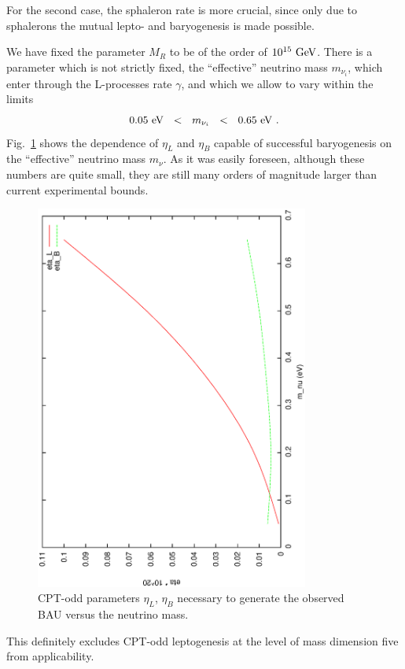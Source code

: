 \documentclass[12pt]{revtex4}
\newcommand{\GeV}{{\rm GeV}}
\newcommand{\eV}{{\rm eV}}
\begin{document}
	For the second case, the sphaleron rate is more crucial, since
	only due to sphalerons the mutual lepto- and baryogenesis is
	made possible. 
	

	We have fixed the parameter $ M_R $ to be of the order of 
	$ 10^{15}~\GeV $.
	There is a parameter which is not strictly fixed,
	the ``effective'' neutrino mass $ m_{\nu_i} $, which enter 
	through the
	L-processes rate $ \gamma $,
	and which we allow to vary within the limits 
\[
	0.05~\eV ~~<~~ m_{\nu_i} ~~<~~0.65~\eV~.
\]
	Fig.~\ref{scan_fig} shows the dependence of $ \eta_L $ and 
	$ \eta_B $ capable
	of successful baryogenesis on the ``effective'' neutrino mass
	$ m_\nu $.
	As it was easily foreseen, although these numbers are quite
	small, they are still many orders of magnitude larger than
	current experimental bounds.
\begin{figure}
\includegraphics[width=9cm,angle=270]{scan.ps}
\caption{CPT-odd parameters $ \eta_L $, $ \eta_B $ necessary to generate
	the observed BAU versus the neutrino mass.}
\label{scan_fig}
\end{figure}
	This definitely excludes CPT-odd leptogenesis at the level of
	mass dimension five from applicability.
\end{document}
